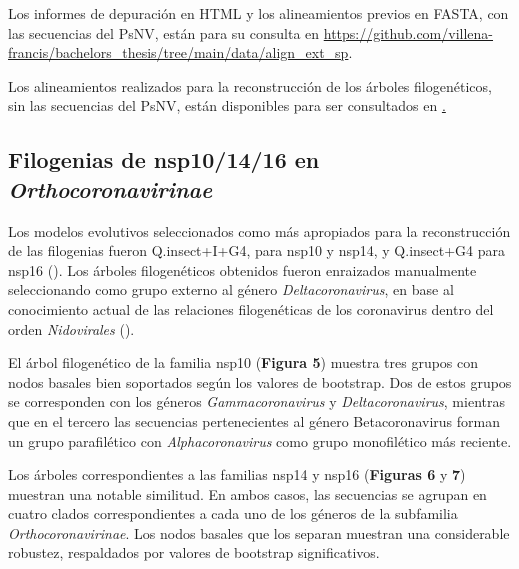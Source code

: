 Los informes de depuración en HTML y los alineamientos previos en FASTA, con
las secuencias del PsNV, están para su consulta en \url{https://github.com/villena-francis/bachelors_thesis/tree/main/data/align_ext_sp}.

Los alineamientos realizados para la reconstrucción de los árboles 
filogenéticos, sin las secuencias del PsNV, están disponibles para ser 
consultados en \href{https://github.com/villena-francis/bachelors_thesis/tree/main/data/align_no_ext_sp}.

\subsection{Filogenias de nsp10/14/16 en \textit{Orthocoronavirinae}}

Los modelos evolutivos seleccionados como más apropiados para la 
reconstrucción de las filogenias fueron Q.insect+I+G4, para nsp10 y nsp14, 
y Q.insect+G4 para nsp16 (\cite{cuongbb_all_2022}). Los árboles 
filogenéticos obtenidos fueron enraizados manualmente seleccionando como 
grupo externo al género \textit{Deltacoronavirus}, en base al conocimiento 
actual de las relaciones filogenéticas de los coronavirus dentro del orden 
\textit{Nidovirales} (\cite{zhou_taxonomy_2021}).

El árbol filogenético de la familia nsp10 (\textbf{Figura 5}) muestra tres 
grupos con nodos basales bien soportados según los valores de bootstrap. Dos
de estos grupos se corresponden con los géneros \textit{Gammacoronavirus} y 
\textit{Deltacoronavirus}, mientras que en el tercero las secuencias 
pertenecientes al género Betacoronavirus forman un grupo parafilético con 
\textit{Alphacoronavirus} como grupo monofilético más reciente. 

Los árboles correspondientes a las familias nsp14 y nsp16 (\textbf{Figuras 
6} y \textbf{7}) muestran una notable similitud. En ambos casos, las 
secuencias se agrupan en cuatro clados correspondientes a cada uno de los 
géneros de la subfamilia \textit{Orthocoronavirinae}. Los nodos basales que 
los separan muestran una considerable robustez, respaldados por valores de 
bootstrap significativos.

